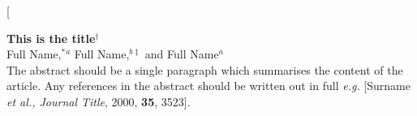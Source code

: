 \documentclass[twoside,twocolumn,9pt]{article}
\begin{document}
\fancyfoot{}
\fancyhead{}
\renewcommand{\headrulewidth}{0pt} 
\renewcommand{\footrulewidth}{0pt}
\setlength{\arrayrulewidth}{1pt}
\setlength{\columnsep}{6.5mm}
\setlength\bibsep{1pt}

\makeatletter 
\newlength{\figrulesep} 
\setlength{\figrulesep}{0.5\textfloatsep} 

\newcommand{\topfigrule}{\vspace*{-1pt}%
\noindent{\color{cream}\rule[-\figrulesep]{\columnwidth}{1.5pt}} }

\newcommand{\botfigrule}{\vspace*{-2pt}%
\noindent{\color{cream}\rule[\figrulesep]{\columnwidth}{1.5pt}} }

\newcommand{\dblfigrule}{\vspace*{-1pt}%
\noindent{\color{cream}\rule[-\figrulesep]{\textwidth}{1.5pt}} }

\makeatother

\twocolumn[
  \begin{@twocolumnfalse}
\vspace{3cm}
\sffamily


\noindent\LARGE{\textbf{This is the title$^\dag$}} \\%

 \noindent\large{Full Name,$^{\ast}$\textit{$^{a}$} Full Name,\textit{$^{b\ddag}$} and Full Name\textit{$^{a}$}} \\%


\noindent\normalsize{The abstract should be a single paragraph which summarises the content of the article. Any references in the abstract should be written out in full \textit{e.g.} [Surname \textit{et al., Journal Title}, 2000, \textbf{35}, 3523].} \\%


 \end{@twocolumnfalse} \vspace{0.6cm}
\end{document}
